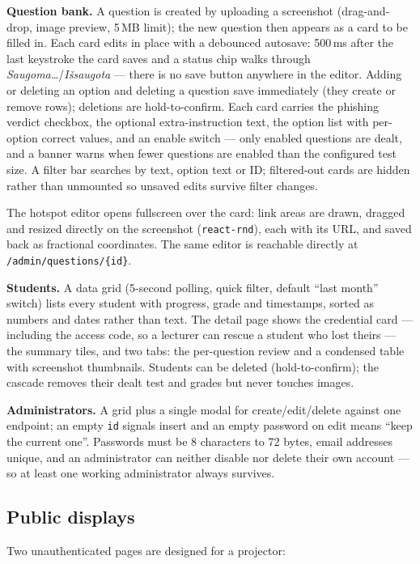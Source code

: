 \documentclass[11pt,a4paper]{article}
\newcommand{\code}[1]{\texttt{#1}}
\begin{document}
\textbf{Question bank.} A question is created by uploading a
screenshot (drag-and-drop, image preview, 5\,MB limit); the new
question then appears as a card to be filled in. Each card edits
in place with a debounced autosave: 500\,ms after the last keystroke
the card saves and a status chip walks through
\emph{Saugoma\ldots}/\emph{Išsaugota} --- there is no save button
anywhere in the editor. Adding or deleting an option and deleting a
question save immediately (they create or remove rows); deletions are
hold-to-confirm. Each card carries the phishing verdict checkbox, the
optional extra-instruction text, the option list with per-option
correct values, and an enable switch --- only enabled questions are
dealt, and a banner warns when fewer questions are enabled than the
configured test size. A filter bar searches by text, option text or
ID; filtered-out cards are hidden rather than unmounted so unsaved
edits survive filter changes.

The hotspot editor opens fullscreen over the card: link areas are
drawn, dragged and resized directly on the screenshot
(\code{react-rnd}), each with its URL, and saved back as fractional
coordinates. The same editor is reachable directly at
\code{/admin/questions/\{id\}}.

\textbf{Students.} A data grid (5-second polling, quick filter,
default ``last month'' switch) lists every student with progress,
grade and timestamps, sorted as numbers and dates rather than text. The detail page shows the credential card ---
including the access code, so a lecturer can rescue a student who lost
theirs --- the summary tiles, and two tabs: the per-question review
and a condensed table with screenshot thumbnails. Students can be
deleted (hold-to-confirm); the cascade removes their dealt test and
grades but never touches images.

\textbf{Administrators.} A grid plus a single modal for
create/edit/delete against one endpoint; an empty \code{id} signals
insert and an empty password on edit means ``keep the current one''.
Passwords must be 8 characters to 72 bytes, email addresses unique,
and an administrator can neither disable nor delete their own account
--- so at least one working administrator always survives.

\subsection{Public displays}

Two unauthenticated pages are designed for a projector:
\end{document}
